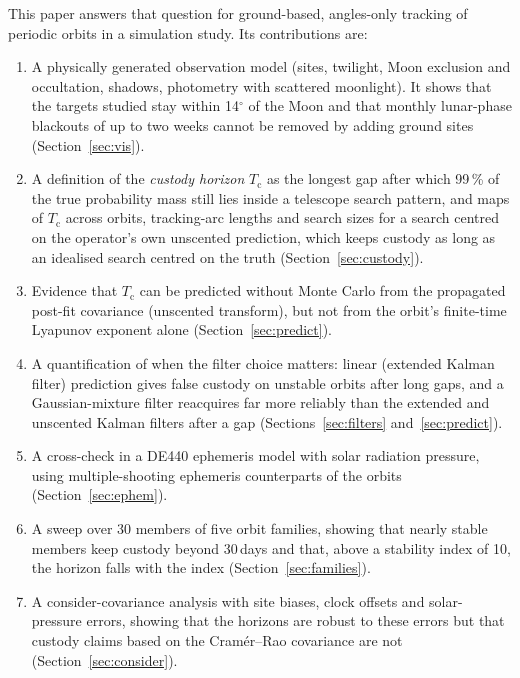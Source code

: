 \documentclass[pdflatex,sn-mathphys-num]{sn-jnl}
\newcommand{\Tc}{T_{\mathrm{c}}}
\begin{document}
This paper answers that question for ground-based, angles-only tracking of periodic orbits in a
simulation study. Its contributions are:
\begin{enumerate}
\item A physically generated observation model (sites, twilight, Moon exclusion and occultation,
      shadows, photometry with scattered moonlight). It shows that the targets studied stay within
      14$^\circ$ of the Moon and that monthly lunar-phase blackouts of up to two weeks cannot be
      removed by adding ground sites (Section~\ref{sec:vis}).
\item A definition of the \emph{custody horizon} $\Tc$ as the longest gap after which 99\,\% of the
      true probability mass still lies inside a telescope search pattern, and maps of $\Tc$ across
      orbits, tracking-arc lengths and search sizes for a search centred on the operator's own
      unscented prediction, which keeps custody as long as an idealised search centred on the truth
      (Section~\ref{sec:custody}).
\item Evidence that $\Tc$ can be predicted without Monte Carlo from the propagated post-fit
      covariance (unscented transform), but not from the orbit's finite-time Lyapunov exponent
      alone (Section~\ref{sec:predict}).
\item A quantification of when the filter choice matters: linear (extended Kalman filter)
      prediction gives false custody on unstable orbits after long gaps, and a Gaussian-mixture
      filter reacquires far more reliably than the extended and unscented Kalman filters after a gap
      (Sections~\ref{sec:filters} and~\ref{sec:predict}).
\item A cross-check in a DE440 ephemeris model with solar radiation pressure, using
      multiple-shooting ephemeris counterparts of the orbits (Section~\ref{sec:ephem}).
\item A sweep over 30 members of five orbit families, showing that nearly stable members keep custody
      beyond 30\,days and that, above a stability index of 10, the horizon falls with the index
      (Section~\ref{sec:families}).
\item A consider-covariance analysis with site biases, clock offsets and solar-pressure errors,
      showing that the horizons are robust to these errors but that custody claims based on the
      Cram\'er--Rao covariance are not (Section~\ref{sec:consider}).
\end{enumerate}

\end{document}
